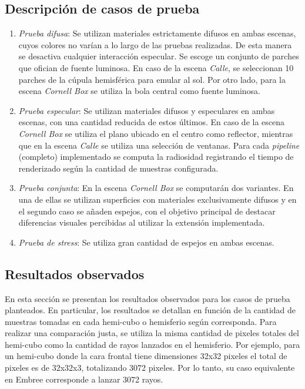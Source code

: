 \subsection{Descripción de casos de prueba}

\begin{enumerate}
	\item \textit{Prueba difusa}: Se utilizan materiales estrictamente difusos en ambas escenas, cuyos colores no varían a lo largo de las pruebas realizadas. De esta manera se desactiva cualquier interacción especular. Se escoge un conjunto de parches que ofician de fuente luminosa. En caso de la escena \textit{Calle}, se seleccionan 10 parches de la cúpula hemisférica para emular al sol. Por otro lado, para la escena \textit{Cornell Box} se utiliza la bola central como fuente luminosa.
	\item \textit{Prueba especular}: Se utilizan materiales difusos y especulares en ambas escenas, con una cantidad reducida de estos últimos. En caso de la escena \textit{Cornell Box} se utiliza el plano ubicado en el centro como reflector, mientras que en la escena \textit{Calle} se utiliza una selección de ventanas. Para cada \textit{pipeline} (completo) implementado se computa la radiosidad registrando el tiempo de renderizado según la cantidad de muestras configurada.
	\item \textit{Prueba conjunta}: En la escena \textit{Cornell Box} se computarán dos variantes. En una de ellas se utilizan superficies con materiales exclusivamente difusos y en el segundo caso se añaden espejos, con el objetivo principal de destacar diferencias visuales percibidas al utilizar la extensión implementada.
	\item \textit{Prueba de stress}: Se utiliza gran cantidad de espejos en ambas escenas.
\end{enumerate}

\subsection{Resultados observados}

En esta sección se presentan los resultados observados para los casos de prueba planteados. En particular, los resultados se detallan en función de la cantidad de muestras tomadas en cada hemi-cubo o hemisferio según corresponda. Para realizar una comparación justa, se utiliza la misma cantidad de pixeles totales del hemi-cubo como la cantidad de rayos lanzados en el hemisferio. Por ejemplo, para un hemi-cubo donde la cara frontal tiene dimensiones 32x32 pixeles el total de pixeles es de 32x32x3, totalizando 3072 pixeles. Por lo tanto, su caso equivalente en Embree corresponde a lanzar 3072 rayos.

